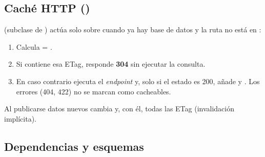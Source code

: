 \subsection{Caché HTTP ()}

 (subclase de ) actúa solo sobre  cuando ya hay base de datos y la ruta no está en :

\begin{enumerate}
\item Calcula  = .
\item Si  contiene esa ETag, responde \textbf{304} sin ejecutar la consulta.
\item En caso contrario ejecuta el \emph{endpoint} y, solo si el estado es 200, añade  y . Los errores (404, 422) no se marcan como cacheables.
\end{enumerate}

Al publicarse datos nuevos cambia  y, con él, todas las ETag (invalidación implícita).

\subsection{Dependencias y esquemas}


